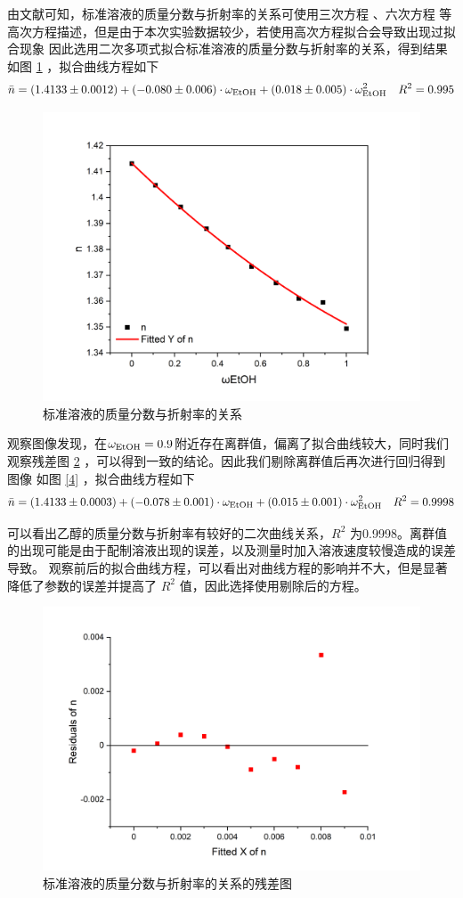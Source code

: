 \documentclass[cn,hazy,pku,12pt,normal,math=newtx,cite=super]{elegantnote}
\begin{document}
由文献可知，标准溶液的质量分数与折射率的关系可使用三次方程 \cite{2003}、六次方程 \cite{zgy}等高次方程描述，但是由于本次实验数据较少，若使用高次方程拟合会导致出现过拟合现象
因此选用二次多项式拟合标准溶液的质量分数与折射率的关系，得到结果如图 \ref{3} ，拟合曲线方程如下
$$
\bar{n} =   (1.4133 \pm 0.0012) + (-0.080 \pm 0.006) \cdot \omega_{\rm EtOH}  + (0.018 \pm 0.005) \cdot \omega_{\rm EtOH} ^2 \quad R^2 = 0.995
$$

\begin{figure}[htbp]
    \centering
    \includegraphics[width = .70\textwidth]{image/Graph3.png}
    \caption{标准溶液的质量分数与折射率的关系}\label{3}
\end{figure}

观察图像发现，在$\omega_{\rm EtOH} = 0.9$附近存在离群值，偏离了拟合曲线较大，同时我们观察残差图 \ref{r} ，可以得到一致的结论。因此我们剔除离群值后再次进行回归得到图像
如图 \ref{4} ，拟合曲线方程如下
$$
\bar{n} =   (1.4133 \pm 0.0003) + (-0.078 \pm 0.001) \cdot \omega_{\rm EtOH} + (0.015 \pm 0.001) \cdot \omega_{\rm EtOH} ^2 \quad R^2 = 0.9998
$$

可以看出乙醇的质量分数与折射率有较好的二次曲线关系，$R^2$ 为0.9998。离群值的出现可能是由于配制溶液出现的误差，以及测量时加入溶液速度较慢造成的误差导致。
观察前后的拟合曲线方程，可以看出对曲线方程的影响并不大，但是显著降低了参数的误差并提高了 $R^2$ 值，因此选择使用剔除后的方程。


\begin{figure}[htbp]
    \centering
    \includegraphics[width = .70\textwidth]{image/Res1.png}
    \caption{标准溶液的质量分数与折射率的关系的残差图}\label{r}
\end{figure}
\end{document}
